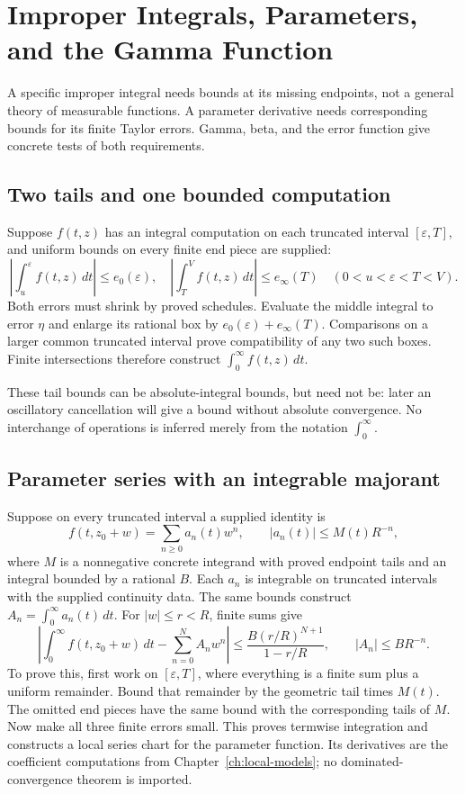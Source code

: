 \chapter{Improper Integrals, Parameters, and the Gamma Function}
\label{ch:improper-parameters}

A specific improper integral needs bounds at its missing endpoints, not a
general theory of measurable functions.  A parameter derivative needs
corresponding bounds for its finite Taylor errors.  Gamma, beta, and the
error function give concrete tests of both requirements.

\section{Two tails and one bounded computation}
Suppose $f(t,z)$ has an integral computation on each truncated interval
$[\varepsilon,T]$, and uniform bounds on every finite end piece are supplied:
\[
 \left|\int_u^\varepsilon f(t,z)\,dt\right|\le e_0(\varepsilon),
 \quad
 \left|\int_T^V f(t,z)\,dt\right|\le e_\infty(T)
 \quad(0<u<\varepsilon<T<V).
\]
Both errors must shrink by proved schedules.  Evaluate the middle integral
to error $\eta$ and enlarge its rational box by
$e_0(\varepsilon)+e_\infty(T)$.  Comparisons on a larger common truncated
interval prove compatibility of any two such boxes.  Finite intersections
therefore construct $\int_0^\infty f(t,z)\,dt$.

These tail bounds can be absolute-integral bounds, but need not be: later
an oscillatory cancellation will give a bound without absolute convergence.
No interchange of operations is inferred merely from the notation
$\int_0^\infty$.

\section{Parameter series with an integrable majorant}
\label{thm:parameter-majorant}
Suppose on every truncated interval a supplied identity is
\[
 f(t,z_0+w)=\sum_{n\ge0}a_n(t)w^n,
 \qquad |a_n(t)|\le M(t)R^{-n},
\]
where $M$ is a nonnegative concrete integrand with proved endpoint tails
and an integral bounded by a rational $B$.  Each $a_n$ is integrable on
truncated intervals with the supplied continuity data.  The same bounds
construct $A_n=\int_0^\infty a_n(t)\,dt$.  For $|w|\le r<R$, finite
sums give
\[
 \left|\int_0^\infty f(t,z_0+w)\,dt-\sum_{n=0}^N A_nw^n\right|
 \le\frac{B(r/R)^{N+1}}{1-r/R},\qquad |A_n|\le BR^{-n}.
\]
To prove this, first work on $[\varepsilon,T]$, where everything is a
finite sum plus a uniform remainder.  Bound that remainder by the
geometric tail times $M(t)$.  The omitted end pieces have the same bound
with the corresponding tails of $M$.  Now make all three finite errors
small.  This proves termwise integration and constructs a local series
chart for the parameter function.  Its derivatives are the coefficient
computations from Chapter~\ref{ch:local-models}; no dominated-convergence
theorem is imported.

